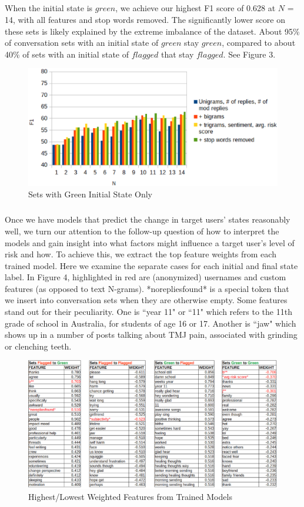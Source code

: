 \documentclass{article}
\begin{document}
\subparagraph{}When the initial state is $green$, we achieve our highest F1 score of 0.628 at $N$ = 14, with all features and stop words removed. The significantly lower score on these sets is likely explained by the extreme imbalance of the dataset. About 95\% of conversation sets with an initial state of $green$ stay $green$, compared to about 40\% of sets with an initial state of $flagged$ that stay $flagged$. See Figure 3.

\begin{figure}[h!]
    \includegraphics[width=14cm]{resultsGreen}
    \caption{Sets with Green Initial State Only}
\end{figure}

\subparagraph{}Once we have models that predict the change in target users' states reasonably well, we turn our attention to the follow-up question of how to interpret the models and gain insight into what factors might influence a target user's level of risk and how. To achieve this, we extract the top feature weights from each trained model. Here we examine the separate cases for each initial and final state label. In Figure 4, highlighted in red are (anonymized) usernames and custom features (as opposed to text N-grams). *norepliesfound* is a special token that we insert into conversation sets when they are otherwise empty. Some features stand out for their peculiarity. One is ``year 11" or ``11" which refers to the 11th grade of school in Australia, for students of age 16 or 17. Another is ``jaw" which shows up in a number of posts talking about TMJ pain, associated with grinding or clenching teeth.

\begin{figure}[h!]
    \includegraphics[width=16cm]{topfeatures}
    \caption{Highest/Lowest Weighted Features from Trained Models}
\end{figure}
\end{document}
